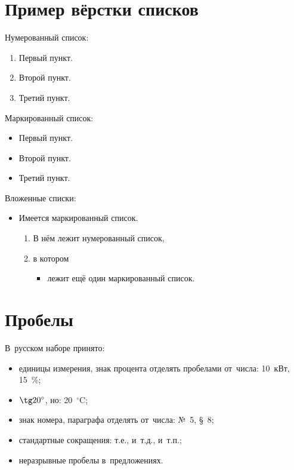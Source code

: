 \section{Пример вёрстки списков} \label{sect2_3}

\noindent Нумерованный список:
\begin{enumerate}
  \item Первый пункт.
  \item Второй пункт.
  \item Третий пункт.
\end{enumerate}

\noindent Маркированный список:
\begin{itemize}
  \item Первый пункт.
  \item Второй пункт.
  \item Третий пункт.
\end{itemize}

\noindent Вложенные списки:
\begin{itemize}
  \item Имеется маркированный список.
  \begin{enumerate}
    \item В нём лежит нумерованный список,
    \item в котором
    \begin{itemize}
      \item лежит ещё один маркированный список.
    \end{itemize}    
  \end{enumerate}
\end{itemize}


\section{Пробелы}

В~русском наборе принято:
\begin{itemize}
    \item единицы измерения, знак процента отделять пробелами от~числа: 10~кВт, 15~\%;
    \item $\tg 20^\circ$, но: 20~${}^\circ$C;
    \item знак номера, параграфа отделять от~числа: №~5, \S~8;
    \item стандартные сокращения: т.\:е., и~т.\:д., и~т.\:п.;
    \item неразрывные пробелы в~предложениях.
\end{itemize}

